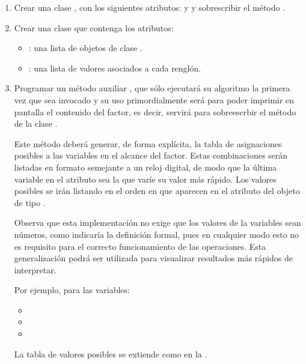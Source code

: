 \begin{enumerate}
  \item Crear una clase , con los siguientes atributos:  y  y sobrescribir el método .

  \item Crear una clase  que contenga los atributos: 
    \begin{itemize}
      \item {}: una lista de objetos de clase .
      \item {}: una lista de valores asociados a cada renglón.
    \end{itemize}
    
  \item Programar un método auxiliar , que sólo ejecutará su algoritmo la primera vez que sea invocado y su uso primordialmente será para poder imprimir en pantalla el contenido del factor, es decir, servirá para sobreescrbir el método  de la clase .
  
  Este método deberá generar, de forma explícita, la tabla de asignaciones posibles a las variables en el alcance del factor.  Estas combinaciones serán listadas en formato semejante a un reloj digital, de modo que la última variable en el atributo  sea la que varíe su valor más rápido.  Los valores posibles se irán listando en el orden en que aparecen en el atributo  del objeto de tipo .
  
  Observa que esta implementación no exige que los valores de la variables sean números, como indicaría la definición formal, pues en cualquier modo esto no es requisito para el correcto funcionamiento de las operaciones.  Esta generalización podrá ser utilizada para visualizar resultados más rápidos de interpretar.
  
  Por ejemplo, para las variables:
  \begin{itemize}
   \item {}
   \item {}
   \item {}
  \end{itemize}
  La tabla de valores posibles se extiende como en la .
  

\end{enumerate}
